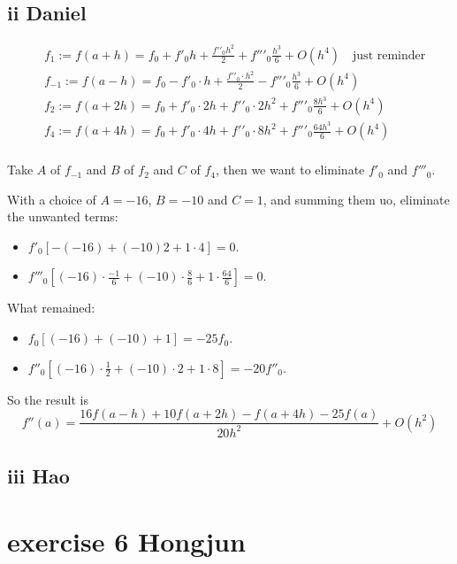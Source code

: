 \documentclass{article}
\begin{document}
\subsection{ii Daniel}

\begin{align}
     & {{f}_{1}}:=f\left( a+h \right)={{f}_{0}}+f{{'}_{0}}h+\frac{f'{{'}_{0}}{{h}^{2}}}{2}+f''{{'}_{0}}\frac{{{h}^{3}}}{6}+O\left( {{h}^{4}} \right)\quad \text{just reminder} \\
     & {{f}_{-1}}:=f\left( a-h \right)={{f}_{0}}-f{{'}_{0}}\cdot h+\frac{f'{{'}_{0}}\cdot {{h}^{2}}}{2}-f''{{'}_{0}}\frac{{{h}^{3}}}{6}+O\left( {{h}^{4}} \right)              \\
     & {{f}_{2}}:=f\left( a+2h \right)={{f}_{0}}+f{{'}_{0}}\cdot 2h+f'{{'}_{0}}\cdot 2{{h}^{2}}+f''{{'}_{0}}\frac{8{{h}^{3}}}{6}+O\left( {{h}^{4}} \right)                     \\
     & {{f}_{4}}:=f\left( a+4h \right)={{f}_{0}}+f{{'}_{0}}\cdot 4h+f'{{'}_{0}}\cdot 8{{h}^{2}}+f''{{'}_{0}}\frac{64{{h}^{3}}}{6}+O\left( {{h}^{4}} \right)                    \\
\end{align}

Take $A$ of $f_{-1}$ and $B$ of $f_{2}$ and $C$ of $f_4$,
then we want to eliminate $f'_0$ and $f'''_0$.

With a choice of $A=-16$, $B=-10$ and $C=1$, and summing them uo, eliminate the unwanted terms:
\begin{itemize}
    \item $f'_0 [-(-16) + (-10)2 + 1\cdot 4] = 0$.
    \item $f'''_0 [(-16)\cdot \frac{-1}{6} + (-10)\cdot \frac{8}{6} + 1\cdot \frac{64}{6}] = 0$.
\end{itemize}
What remained:
\begin{itemize}
    \item $f_0 [(-16) + (-10) + 1] = -25f_0$.
    \item $f''_0 [(-16)\cdot \frac{1}{2} + (-10)\cdot 2 + 1\cdot 8] = -20f''_0$.
\end{itemize}

So the result is
\[f''\left( a \right)=\frac{16f\left( a-h \right)+10f\left( a+2h \right)-f\left( a+4h \right)-25f\left( a \right)}{20{{h}^{2}}}+O\left( {{h}^{2}} \right)\]
\subsection{iii Hao}

\section{exercise 6 Hongjun}
\end{document}
